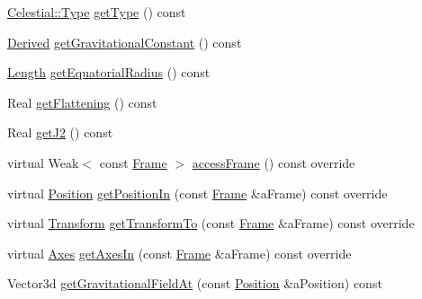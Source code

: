 \begin{DoxyCompactItemize}
\item 
\hyperlink{classlibrary_1_1physics_1_1env_1_1obj_1_1_celestial_aab1f58aa727e639288d65f3d33c4f245}{Celestial\+::\+Type} \hyperlink{classlibrary_1_1physics_1_1env_1_1obj_1_1_celestial_ae020ad574249ea82679347c0a6933355}{get\+Type} () const
\item 
\hyperlink{classlibrary_1_1physics_1_1units_1_1_derived}{Derived} \hyperlink{classlibrary_1_1physics_1_1env_1_1obj_1_1_celestial_a3c7c4b64ec4b37e311fe914b4ea5b9d1}{get\+Gravitational\+Constant} () const
\item 
\hyperlink{classlibrary_1_1physics_1_1units_1_1_length}{Length} \hyperlink{classlibrary_1_1physics_1_1env_1_1obj_1_1_celestial_a7dd4326ff317292262d1a9adf8887cfe}{get\+Equatorial\+Radius} () const
\item 
Real \hyperlink{classlibrary_1_1physics_1_1env_1_1obj_1_1_celestial_aac48ed47a25a10c120f066995dc3c6d4}{get\+Flattening} () const
\item 
Real \hyperlink{classlibrary_1_1physics_1_1env_1_1obj_1_1_celestial_a3740b398dca520bd50862f67c29ab8e7}{get\+J2} () const
\item 
virtual Weak$<$ const \hyperlink{classlibrary_1_1physics_1_1coord_1_1_frame}{Frame} $>$ \hyperlink{classlibrary_1_1physics_1_1env_1_1obj_1_1_celestial_a2c3035480bad1749f12d1170113ba2ad}{access\+Frame} () const override
\item 
virtual \hyperlink{classlibrary_1_1physics_1_1coord_1_1_position}{Position} \hyperlink{classlibrary_1_1physics_1_1env_1_1obj_1_1_celestial_a3b5b5b5e1f0749345afc5e6cead6e86e}{get\+Position\+In} (const \hyperlink{classlibrary_1_1physics_1_1coord_1_1_frame}{Frame} \&a\+Frame) const override
\item 
virtual \hyperlink{classlibrary_1_1physics_1_1coord_1_1_transform}{Transform} \hyperlink{classlibrary_1_1physics_1_1env_1_1obj_1_1_celestial_aa8efdcb1d3e0f51be20291a74ca1fdc7}{get\+Transform\+To} (const \hyperlink{classlibrary_1_1physics_1_1coord_1_1_frame}{Frame} \&a\+Frame) const override
\item 
virtual \hyperlink{classlibrary_1_1physics_1_1coord_1_1_axes}{Axes} \hyperlink{classlibrary_1_1physics_1_1env_1_1obj_1_1_celestial_ad13d0656d681ca53ee4cbfe7792db036}{get\+Axes\+In} (const \hyperlink{classlibrary_1_1physics_1_1coord_1_1_frame}{Frame} \&a\+Frame) const override
\item 
Vector3d \hyperlink{classlibrary_1_1physics_1_1env_1_1obj_1_1_celestial_ac715a5cc62581070d55ab839e3309c9e}{get\+Gravitational\+Field\+At} (const \hyperlink{classlibrary_1_1physics_1_1coord_1_1_position}{Position} \&a\+Position) const
\end{DoxyCompactItemize}
